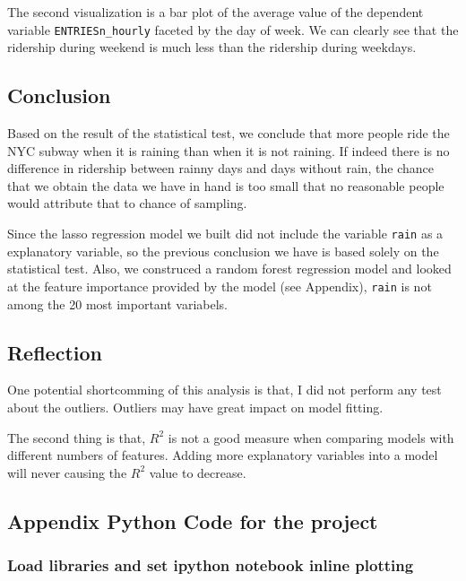 \documentclass{article}
\begin{document}
The second visualization is a bar plot of the average value of the
dependent variable \texttt{ENTRIESn\_hourly} faceted by the day of week.
We can clearly see that the ridership during weekend is much less than
the ridership during weekdays.

    \subsection{Conclusion}\label{conclusion}

Based on the result of the statistical test, we conclude that more
people ride the NYC subway when it is raining than when it is not
raining. If indeed there is no difference in ridership between rainny
days and days without rain, the chance that we obtain the data we have
in hand is too small that no reasonable people would attribute that to
chance of sampling.

Since the lasso regression model we built did not include the variable
\texttt{rain} as a explanatory variable, so the previous conclusion we
have is based solely on the statistical test. Also, we construced a
random forest regression model and looked at the feature importance
provided by the model (see Appendix), \texttt{rain} is not among the 20
most important variabels.

    \subsection{Reflection}\label{reflection}

One potential shortcomming of this analysis is that, I did not perform
any test about the outliers. Outliers may have great impact on model
fitting.

The second thing is that, $R^2$ is not a good measure when comparing
models with different numbers of features. Adding more explanatory
variables into a model will never causing the $R^2$ value to decrease.

    \subsection{Appendix Python Code for the
project}\label{appendix-python-code-for-the-project}

\subsubsection{Load libraries and set ipython notebook inline
plotting}\label{load-libraries-and-set-ipython-notebook-inline-plotting}
\end{document}

